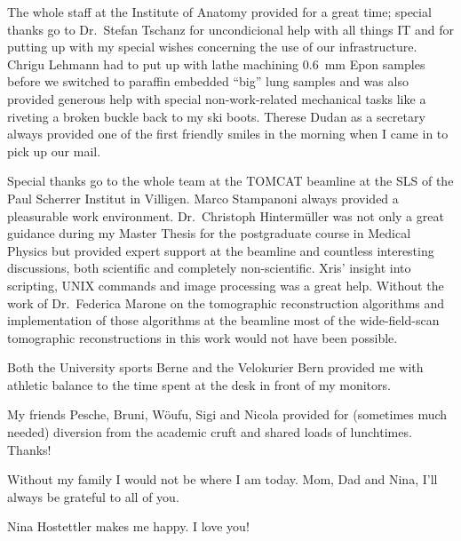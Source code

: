 The whole staff at the Institute of Anatomy provided for a great time; special thanks go to Dr.\ Stefan Tschanz for uncondicional help with all things IT and for putting up with my special wishes concerning the use of our infrastructure. Chrigu Lehmann had to put up with lathe machining \SI{0.6}{\milli\meter} Epon samples before we switched to paraffin embedded ``big'' lung samples and was also provided generous help with special non-work-related mechanical tasks like a riveting a broken buckle back to my ski boots. Therese Dudan as a secretary always provided one of the first friendly smiles in the morning when I came in to pick up our mail.

Special thanks go to the whole team at the \acs{TOMCAT} beamline at the \acl{SLS} of the Paul Scherrer Institut in Villigen. Marco Stampanoni always provided a pleasurable work environment. Dr.\ Christoph Hintermüller was not only a great guidance during my Master Thesis for the postgraduate course in Medical Physics but provided expert support at the beamline and countless interesting discussions, both scientific and completely non-scientific. Xris' insight into scripting, UNIX commands and image processing was a great help. Without the work of Dr.\ Federica Marone on the tomographic reconstruction algorithms and implementation of those algorithms at the beamline most of the wide-field-scan tomographic reconstructions in this work would not have been possible.

Both the University sports Berne and the Velokurier Bern provided me with athletic balance to the time spent at the desk in front of my monitors.

My friends Pesche, Bruni, Wöufu, Sigi and Nicola provided for (sometimes much needed) diversion from the academic cruft and shared loads of lunchtimes. Thanks!

Without my family I would not be where I am today. Mom, Dad and Nina, I'll always
be grateful to all of you.

Nina  Hostettler makes me happy. I love you!
\endgroup